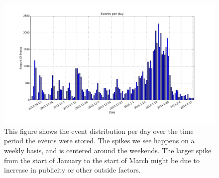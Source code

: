     \begin{figure}[H]
        \includegraphics[width=5in]{image/eventsPerDay.png}
        \centering
        \caption[Distribution of events per day]{This figure shows the event distribution per day over the time period the events were stored.
        The spikes we see happens on a weekly basis, and is centered around the weekends.
        The larger spike from the start of January to the start of March might be due to increase in publicity or other outside factors.}
    \end{figure}

